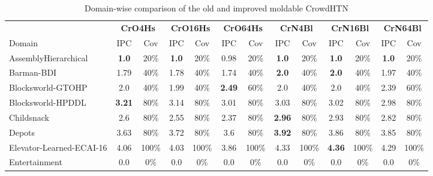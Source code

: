 \begin{table}
	\caption{Domain-wise comparison of the old and improved moldable CrowdHTN}
	\label{table: eval old new}
	
	
	\begin{adjustbox}{angle=90}
	
	\begin{tabular}{|l|cc|cc|cc|cc|cc|cc|}
		\hline
		& \multicolumn{2}{c|}{\textbf{CrO4Hs}} & \multicolumn{2}{c|}{\textbf{CrO16Hs}} & \multicolumn{2}{c|}{\textbf{CrO64Hs}} & \multicolumn{2}{c|}{\textbf{CrN4Bl}} & \multicolumn{2}{c|}{\textbf{CrN16Bl}} & \multicolumn{2}{c|}{\textbf{CrN64Bl}}\\
		Domain & IPC & Cov & IPC & Cov & IPC & Cov & IPC & Cov & IPC & Cov & IPC & Cov\\
		\hline
		AssemblyHierarchical & \textbf{1.0} & 20\%  & \textbf{1.0} & 20\%  & 0.98 & 20\%  & \textbf{1.0} & 20\%  & \textbf{1.0} & 20\%  & \textbf{1.0} & 20\%  \\
		Barman-BDI & 1.79 & 40\%  & 1.78 & 40\%  & 1.74 & 40\%  & \textbf{2.0} & 40\%  & \textbf{2.0} & 40\%  & 1.97 & 40\%  \\
		Blocksworld-GTOHP & 2.0 & 40\%  & 1.99 & 40\%  & \textbf{2.49} & 60\%  & 2.0 & 40\%  & 2.0 & 40\%  & 2.39 & 60\%  \\
		Blocksworld-HPDDL & \textbf{3.21} & 80\%  & 3.14 & 80\%  & 3.01 & 80\%  & 3.03 & 80\%  & 3.02 & 80\%  & 2.98 & 80\%  \\
		Childsnack & 2.6 & 80\%  & 2.55 & 80\%  & 2.37 & 80\%  & \textbf{2.96} & 80\%  & 2.93 & 80\%  & 2.82 & 80\%  \\
		Depots & 3.63 & 80\%  & 3.72 & 80\%  & 3.6 & 80\%  & \textbf{3.92} & 80\%  & 3.86 & 80\%  & 3.85 & 80\%  \\
		Elevator-Learned-ECAI-16 & 4.06 & 100\%  & 4.03 & 100\%  & 3.86 & 100\%  & 4.33 & 100\%  & \textbf{4.36} & 100\%  & 4.29 & 100\%  \\
		Entertainment & 0.0 & 0\%  & 0.0 & 0\%  & 0.0 & 0\%  & 0.0 & 0\%  & 0.0 & 0\%  & 0.0 & 0\%  \\

\end{tabular}
\end{adjustbox}
\end{table}
